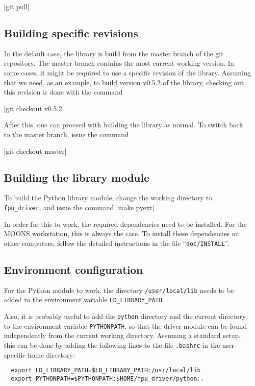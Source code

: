 \documentclass{scrartcl}[12pt,a4paper]
\begin{document}
|git pull|


\subsection{Building specific revisions}
In the default case, the library is build from
the master branch of the git repository.
The master branch contains the most current
working version.
In some cases, it might be required to
use a specific revision of the library.
Assuming that we need, as an example,
to build version v0.5.2 of the library,
checking out this revision is done with the
command

|git checkout v0.5.2|

After this, one can proceed with building the library as normal. To
switch back to the master branch, issue the command

|git checkout master|


\subsection{Building the library module}

To build the Python library module,
change the working directory to \texttt{fpu\_driver},
and issue the command |make pyext|

In order for this to work, the required dependencies need to be
installed. For the MOONS workstation, this is always the case. To
install these dependencies on other computers, follow the detailed
instructions in the file ``\texttt{doc/INSTALL}''.

\subsection{Environment configuration}

For the Python module to work, the directory \texttt{/user/local/lib}
needs to be added to the environment variable
\texttt{LD\_LIBRARY\_PATH}.

Also, it is probably useful to add the \texttt{python} directory and
the current directory to the environment variable \texttt{PYTHONPATH},
so that the driver module can be found independently from the current
working directory.  Assuming a standard setup, this can be done by
adding the following lines to the file \texttt{.bashrc} in the
user-specific home directory:

\begin{verbatim}
  export LD_LIBRARY_PATH=$LD_LIBRARY_PATH:/usr/local/lib
  export PYTHONPATH=$PYTHONPATH:$HOME/fpu_driver/python:.
\end{verbatim}
\end{document}
